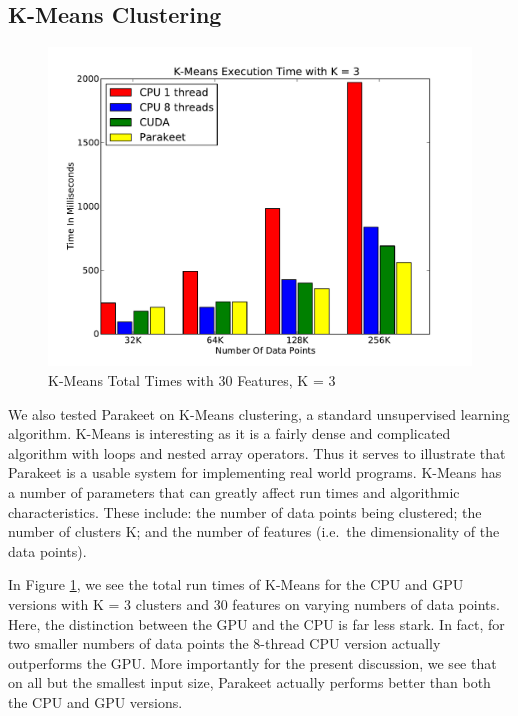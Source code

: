\documentclass[preprint]{sigplanconf}
\begin{document}
\subsection{K-Means Clustering}
\label{results-k-means}

\begin{figure}
\includegraphics[scale=0.45]{KMCPUK3.pdf}
\caption{K-Means Total Times with 30 Features, K = 3}
\label{KMCPU3}
\end{figure}

We also tested Parakeet on K-Means clustering, a standard unsupervised learning algorithm.  K-Means is interesting as it is a fairly dense and complicated algorithm with loops and nested array operators.  Thus it serves to illustrate that Parakeet is a usable system for implementing real world programs.  K-Means has a number of parameters that can greatly affect run times and algorithmic characteristics.  These include: the number of data points being clustered; the number of clusters K; and the number of features (i.e.~the dimensionality of the data points).

In Figure \ref{KMCPU3}, we see the total run times of K-Means for the CPU and GPU versions with K = 3 clusters and 30 features on varying numbers of data points.  Here, the distinction between the GPU and the CPU is far less stark.  In fact, for two smaller numbers of data points the 8-thread CPU version actually outperforms the GPU.  More importantly for the present discussion, we see that on all but the smallest input size, Parakeet actually performs better than both the CPU and GPU versions.
\end{document}

